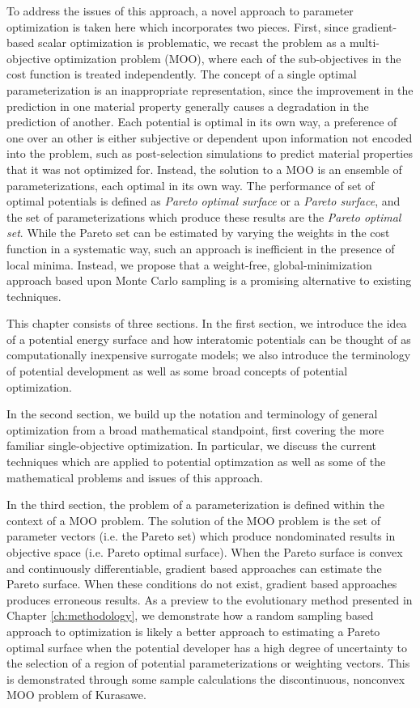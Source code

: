 To address the issues of this approach, a novel approach to parameter optimization is taken here which incorporates two pieces.  First, since gradient-based scalar optimization is problematic, we recast the problem as a multi-objective optimization problem (MOO), where each of the sub-objectives in the cost function is treated independently.  The concept of a single optimal parameterization is an inappropriate representation, since the improvement in the prediction in one material property generally causes a degradation in the prediction of another.  Each potential is optimal in its own way, a preference of one over an other is either subjective or dependent upon information not encoded into the problem, such as post-selection simulations to predict material properties that it was not optimized for.  Instead, the solution to a MOO is an ensemble of parameterizations, each optimal in its own way.  The performance of set of optimal potentials is defined as \emph{Pareto optimal surface} or a \emph{Pareto surface}, and the set of parameterizations which produce these results are the \emph{Pareto optimal set}.  While the Pareto set can be estimated by varying the weights in the cost function in a systematic way, such an approach is inefficient in the presence of local minima.  Instead, we propose that a weight-free, global-minimization approach based upon Monte Carlo sampling is a promising alternative to existing techniques.

This chapter consists of three sections.  In the first section, we introduce the idea of a potential energy surface and how interatomic potentials can be thought of as computationally inexpensive surrogate models; we also introduce the terminology of potential development as well as some broad concepts of potential optimization.

In the second section, we build up the notation and terminology of general optimization from a broad mathematical standpoint, first covering the more familiar single-objective optimization.  In particular, we discuss the current techniques which are applied to potential optimzation as well as some of the mathematical problems and issues of this approach.

In the third section, the problem of a parameterization is defined within the context of a MOO problem.  The solution of the MOO problem is the set of parameter vectors (i.e. the Pareto set) which produce nondominated results in objective space (i.e.  Pareto optimal surface).  When the Pareto surface is convex and continuously differentiable, gradient based approaches can estimate the Pareto surface.  When these conditions do not exist, gradient based approaches produces erroneous results.  As a preview to the evolutionary method presented in Chapter \ref{ch:methodology}, we demonstrate how a random sampling based approach to optimization is likely a better approach to estimating a Pareto optimal surface when the potential developer has a high degree of uncertainty to the selection of a region of potential parameterizations or weighting vectors.  This is demonstrated through some sample calculations the discontinuous, nonconvex MOO problem of Kurasawe\cite{kursawe1991_pareto}.

